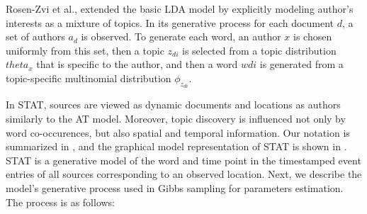 \documentclass[conference]{IEEEtran}
\newcommand{\model}{{STAT}\xspace} %
\begin{document}
Rosen-Zvi et al., extended the basic LDA model by explicitly modeling author's interests as a mixture of topics. In its generative process for each document $d$, a set of authors $a_d$ is observed. To generate each word, an author $x$ is chosen uniformly from this set, then a topic $z_{di}$ is selected from a topic distribution $theta_{x}$ that is specific to the author, and then a word  $w{di}$ is generated from a topic-specific multinomial distribution $\phi_{z_{di}}$.

In \model, sources are viewed as dynamic documents and locations as authors similarly to the AT model. Moreover, topic discovery is influenced not only by word co-occurences, but also spatial and temporal information. Our notation is summarized in , and the graphical model representation of \model is shown in .  \model is a generative model of the word and time point in the timestamped event entries of all sources corresponding to an observed location. Next, we describe the model's generative process used in Gibbs sampling for parameters estimation. The process is as follows: 
\end{document}

